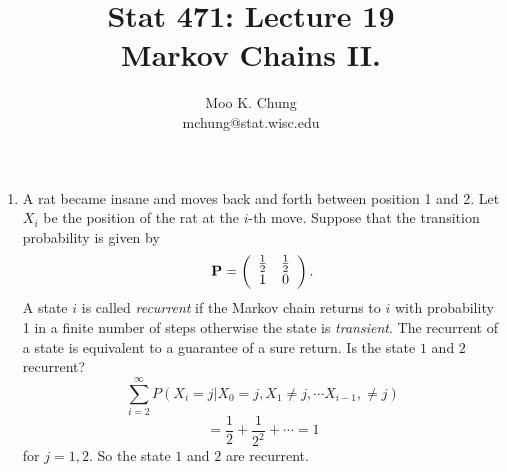 \documentclass[12pt,twocolumn]{article} %
\begin{document}
\title{Stat 471: Lecture 19\\
Markov Chains II.}
\author{Moo K. Chung\\
mchung@stat.wisc.edu}
\maketitle \thispagestyle{empty}
\begin{enumerate} 

\item A rat became insane and moves back and forth between position 1 and 2. Let $X_i$ be the
position of the rat at the $i$-th move. Suppose that the transition probability is given by 
$${\bf P}=\left(
\begin{array}{cc}
  \frac{1}{2} & \frac{1}{2} \\
  1 & 0 \\
\end{array}
\right).$$ 
A state $i$ is called {\em recurrent} if the Markov chain returns to $i$ with probability 1 in a finite number of steps otherwise the state is {\em transient}. The recurrent of a state is equivalent to a guarantee of a sure return. Is the state $1$ and $2$ recurrent?
$$\sum_{i=2}^{\infty} P(X_{i}=j|X_0=j,X_1 \neq j,\cdots X_{i-1}, \neq j)$$
$$=\frac{1}{2}+\frac{1}{2^2} + \cdots  =1$$
 for $j=1,2$. So the state $1$ and $2$ are recurrent.


\end{enumerate}
\end{document}
